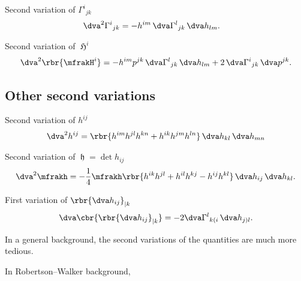 \documentclass[a4paper,11pt]{article}
\begin{document}
Second variation of $\Gamma^i{}_{jk}$
\begin{align}
\dva^2 \Gamma^i{}_{jk} &=
- h^{im} \,\dva\Gamma^{l}{}_{jk} \,\dva h_{lm}.
\end{align}

Second variation of $\mfrakH^i$
\begin{align}
\dva^2\rbr{\mfrakH^i} = -h^{im}p^{jk}
\,\dva\Gamma^{l}{}_{jk}\,\dva h_{lm} + 2\,\dva\Gamma^{i}{}_{jk}\,\dva p^{jk}.
\end{align}


\subsection*{Other second variations}

Second variation of $h^{ij}$
\begin{align}
\dva^2 h^{ij} = \rbr{h^{im}h^{jl}h^{kn}+h^{ik}h^{jm}h^{ln}}
\,\dva h_{kl}\,\dva h_{mn}
\end{align}

Second variation of $\mfrakh = \det h_{ij}$
\begin{align}
\dva^2 \mfrakh = -\frac{1}{4} \mfrakh \rbr{
h^{ik}h^{jl}+h^{il}h^{kj}-h^{ij}h^{kl}}\,\dva h_{ij}\,\dva h_{kl}.
\end{align}

First variation of $\rbr{\dva h_{ij}}_{|k}$
\begin{align}
\dva\cbr{\rbr{\dva h_{ij}}_{|k}} = -2 \dva\Gamma^l{}_{k(i}\,\dva h_{j)l}.
\end{align}



In a general background, the second variations of the quantities are much more 
tedious.

In Robertson--Walker background, 


\printbibliography
\end{document}
